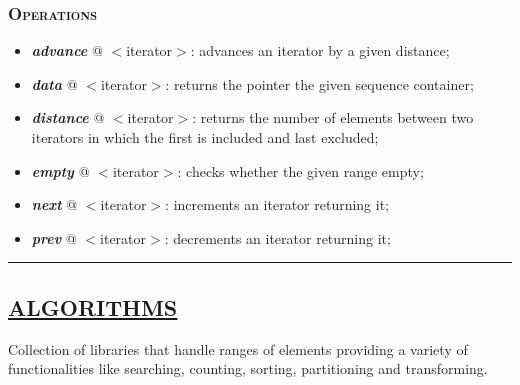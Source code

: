\documentclass[10pt]{article}
\begin{document}
\begin{multicols*}{5}
{\subsubsection*{\textsc{Operations}} 
\begin{itemize}[leftmargin=*,topsep=0.25pt]
  \setlength\itemsep{-1.8pt}
	\item  \emph{\textbf{advance}} @ $<$iterator$>$: advances an iterator by a given distance;
	\item  \emph{\textbf{data}} @ $<$iterator$>$: returns the pointer the given sequence container;
	\item  \emph{\textbf{distance}} @ $<$iterator$>$: returns the number of elements between two iterators in which the first is included and last excluded;
	\item  \emph{\textbf{empty}} @ $<$iterator$>$: checks whether the given range empty;
	\item  \emph{\textbf{next}} @ $<$iterator$>$: increments an iterator returning it;
	\item  \emph{\textbf{prev}} @ $<$iterator$>$: decrements an iterator returning it;
\end{itemize}
}

\par\noindent\rule{155pt}{0.4pt}

{\color{Blue}
\subsection*{\href{https://en.cppreference.com/w/cpp/algorithm}{\underline{ALGORITHMS}}}	
\noindent  
Collection of libraries that handle ranges of elements providing a variety of functionalities like searching, counting, sorting, partitioning and transforming.

}
\end{multicols*}
\end{document}
